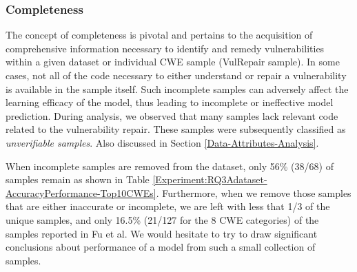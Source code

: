 \subsubsection{Completeness}\label{Result-Completeness}
The concept of completeness is pivotal and pertains to the acquisition of comprehensive information necessary to identify and remedy vulnerabilities within a given dataset or individual CWE sample (VulRepair sample).
In some cases, not all of the code necessary to either understand or repair a vulnerability is available in the sample itself.
Such incomplete samples can adversely affect the learning efficacy of the model, thus leading to incomplete or ineffective model prediction.
During analysis, we observed that many samples lack relevant code related to the vulnerability repair.
These samples were subsequently classified as \emph{unverifiable samples}. Also discussed in Section \ref{Data-Attributes-Analysis}.

When incomplete samples are removed from the dataset, only 56\% (38/68) of samples remain as shown in Table \ref{Experiment:RQ3Adataset-AccuracyPerformance-Top10CWEs}.
Furthermore, when we remove those samples that are either inaccurate or incomplete, we are left with less that 1/3 of the unique samples, and only 16.5\% (21/127 for the 8 CWE categories) of the samples reported in Fu et al.\cite{fu2022vulrepair}
We would hesitate to try to draw significant conclusions about performance of a model from such a small collection of samples.

    
    
